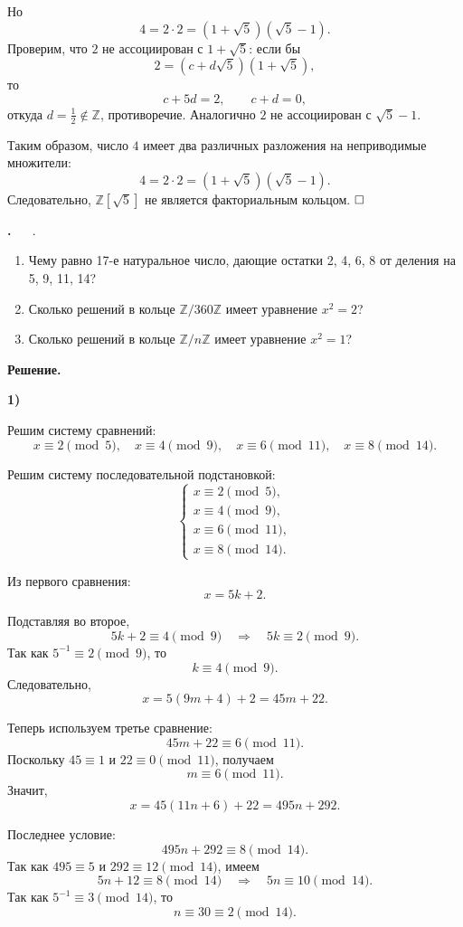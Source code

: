 \documentclass[12pt,a4paper]{article}
\newcounter{task}                   %
\newenvironment{task}[1][]{%
  \refstepcounter{task}%
  \par\vspace{0.3\baselineskip}%
  \noindent\textbf{\thetask.}%
  \if\relax\detokenize{#1}\relax   %
    \ \ignorespaces                 %
  \else
    \ \textbf{#1}.\ \ignorespaces   %
  \fi
}{%
  \par\vspace{0.2\baselineskip}%
}
\newcommand{\sol}{%
  \par\vspace{0.3\baselineskip}%
  \noindent\textbf{Решение.}\ %
  \ignorespaces                     %
}
\newcommand{\soli}[1]{%
  \par\vspace{0.15\baselineskip}%
  \noindent\textbf{#1)}\ %
  \ignorespaces                     %
}
\begin{document}
Но
\[
4=2\cdot 2=(1+\sqrt5)(\sqrt5-1).
\]
Проверим, что $2$ не ассоциирован с $1+\sqrt5$: если бы
\[
2=(c+d\sqrt5)(1+\sqrt5),
\]
то
\[
c+5d=2,\qquad c+d=0,
\]
откуда $d=\frac12\notin\mathbb Z$, противоречие. Аналогично $2$ не ассоциирован с $\sqrt5-1$.

Таким образом, число $4$ имеет два различных разложения на неприводимые множители:
\[
4=2\cdot 2=(1+\sqrt5)(\sqrt5-1).
\]
Следовательно, $\mathbb Z[\sqrt5]$ не является факториальным кольцом. $\hfill \square$

\begin{task}
    \begin{enumerate}
	\item Чему равно 17-е натуральное число, дающие остатки 2, 4, 6, 8 от деления на 5, 9, 11, 14?

	\item Сколько решений в кольце $\mathbb{Z} / 360 \mathbb{Z}$ имеет уравнение $x^2 = 2$?

	\item Сколько решений в кольце $\mathbb{Z}/n\mathbb{Z}$ имеет уравнение $x^2 = 1$?
    \end{enumerate}
\end{task}

\sol
\soli{1}
Решим систему сравнений:
\[
x\equiv 2\pmod 5,\quad x\equiv 4\pmod 9,\quad x\equiv 6\pmod {11},\quad x\equiv 8\pmod {14}.
\]

Решим систему последовательной подстановкой:
\[
\begin{cases}
x\equiv 2\pmod 5,\\
x\equiv 4\pmod 9,\\
x\equiv 6\pmod{11},\\
x\equiv 8\pmod{14}.
\end{cases}
\]

Из первого сравнения:
\[
x=5k+2.
\]

Подставляя во второе,
\[
5k+2\equiv 4\pmod 9
\quad\Longrightarrow\quad
5k\equiv 2\pmod 9.
\]
Так как \(5^{-1}\equiv 2\pmod 9\), то
\[
k\equiv 4\pmod 9.
\]
Следовательно,
\[
x=5(9m+4)+2=45m+22.
\]

Теперь используем третье сравнение:
\[
45m+22\equiv 6\pmod{11}.
\]
Поскольку \(45\equiv 1\) и \(22\equiv 0\pmod{11}\), получаем
\[
m\equiv 6\pmod{11}.
\]
Значит,
\[
x=45(11n+6)+22=495n+292.
\]

Последнее условие:
\[
495n+292\equiv 8\pmod{14}.
\]
Так как \(495\equiv 5\) и \(292\equiv 12\pmod{14}\), имеем
\[
5n+12\equiv 8\pmod{14}
\quad\Longrightarrow\quad
5n\equiv 10\pmod{14}.
\]
Так как \(5^{-1}\equiv 3\pmod{14}\), то
\[
n\equiv 30\equiv 2\pmod{14}.
\]
\end{document}

